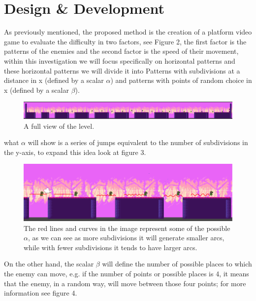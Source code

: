 \section{Design \& Development}

As previously mentioned, the proposed method is the creation of a platform video game to evaluate the difficulty in two factors, see Figure 2, the first factor is the patterns of the enemies and the second factor is the speed of their movement, within this investigation we will focus specifically on horizontal patterns and these horizontal patterns we will divide it into Patterns with subdivisions at a distance in x (defined by a scalar $\alpha$) and patterns with points of random choice in x (defined by a scalar $\beta$).

\begin{figure}[ht]
    \centering
      \includegraphics[width=\linewidth]{Figures/completelevel.png}
      \caption{A full view of the level.}
    \label{fig:example}
\end{figure}

what $\alpha$ will show is a series of jumps equivalent to the number of subdivisions in the y-axis, to expand this idea look at figure 3.

\begin{figure}[ht]
    \centering
      \includegraphics[width=\linewidth]{Figures/alphapath.png}
      \caption{The red lines and curves in the image represent some of the possible $\alpha$, as we can see as more subdivisions it will generate smaller arcs, while with fewer subdivisions it tends to have larger arcs.}
    \label{fig:example}
\end{figure}

On the other hand, the scalar $\beta$ will define the number of possible places to which the enemy can move, e.g. if the number of points or possible places is 4, it means that the enemy, in a random way, will move between those four points; for more information see figure 4.

